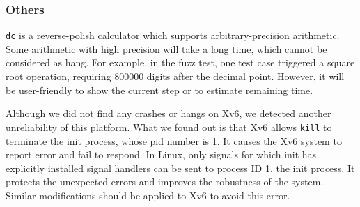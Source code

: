 \subsubsection{Others}
\texttt{dc} is a reverse-polish calculator which supports arbitrary-precision arithmetic. Some arithmetic with high precision will take a long time, which cannot be considered as hang. For example, in the fuzz test, one test case triggered a square root operation, requiring 800000 digits after the decimal point. However, it will be user-friendly to show the current step or to estimate remaining time.

Although we did not find any crashes or hangs on Xv6, we detected another unreliability of this platform. What we found out is that Xv6 allows \texttt{kill} to terminate the init process, whose pid number is 1. It causes the Xv6 system to report error and fail to respond. In Linux, only signals for which init has explicitly installed signal handlers can be sent to process ID 1, the init process\cite{KILL(2)}. It protects the unexpected errors and improves the robustness of the system. Similar modifications should be applied to Xv6 to avoid this error. 

